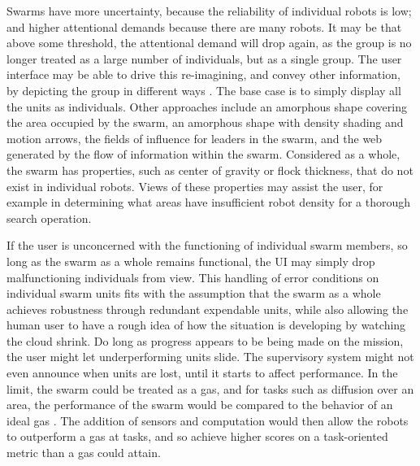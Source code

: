 \documentclass[]{article}
\begin{document}
Swarms have more uncertainty, because the reliability of individual robots is low; and higher attentional demands because there are many robots. 
It may be that above some threshold, the attentional demand will drop again, as the group is no longer treated as a large number of individuals, but as a single group. 
The user interface may be able to drive this re-imagining, and convey other information, by depicting the group in different ways \cite{manning2015heuristic}.
The base case is to simply display all the units as individuals. 
Other approaches include an amorphous shape covering the area occupied by the swarm, an amorphous shape with density shading and motion arrows, the fields of influence for leaders in the swarm, and the web generated by the flow of information within the swarm. 
Considered as a whole, the swarm has properties, such as center of gravity or flock thickness, that do not exist in individual robots. 
Views of these properties may assist the user, for example in determining what areas have insufficient robot density for a thorough search operation. 

If the user is unconcerned with the functioning of individual swarm members, so long as the swarm as a whole remains functional, the UI may simply drop malfunctioning individuals from view. 
This handling of error conditions on individual swarm units fits with the assumption that the swarm as a whole achieves robustness through redundant expendable units, while also allowing the human user to have a rough idea of how the situation is developing by watching the cloud shrink. 
Do long as progress appears to be being made on the mission, the user might let underperforming units slide. 
The supervisory system might not even announce when units are lost, until it starts to affect performance.  
In the limit, the swarm could be treated as a gas, and for tasks such as diffusion over an area, the performance of the swarm would be compared to the behavior of an ideal gas \cite{jantz1997kinetics}.
The addition of sensors and computation would then allow the robots to outperform a gas at tasks, and so achieve higher scores on a task-oriented metric than a gas could attain. 
 
\end{document}
